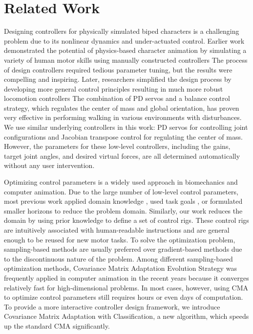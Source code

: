\section{Related Work}

Designing controllers for physically simulated biped characters is a
challenging problem due to its nonlinear dynamics and under-actuated
control. Earlier work demonstrated the potential of physics-based
character animation by simulating a variety of human motor skills
using manually constructed controllers
The process of design
controllers required tedious parameter tuning, but the results were
compelling and inspiring. Later, researchers simplified the design
process by developing more general control principles 
resulting in much more robust locomotion controllers
The combination of PD servos and a
balance control strategy, which regulates the center of mass and
global orientation, has proven very effective in performing walking in
various environments with disturbances. We use similar underlying
controllers in this work: PD servos for controlling joint
configurations and Jacobian transpose control \cite{Sunada:1994:ACJ}
for regulating the center of mass. However, the parameters for these
low-level controllers, including the gains, target joint angles, and
desired virtual forces, are all determined automatically without any
user intervention.

Optimizing control parameters is a widely used approach in
biomechanics and computer animation. Due to the large number of
low-level control parameters, most previous work applied domain
knowledge \cite{Wang:2009:OWC,Wang:2010:OWC,Wang:2012:OLC}, used task
goals \cite{Yin:2008:CMA,Wu:2010:TBL,Liu:2012:TRC}, or formulated
smaller horizons \cite{Sok:2007:SBB} to reduce the problem
domain. Similarly, our work reduces the domain by using prior
knowledge to define a set of control rigs. These control rigs are
intuitively associated with human-readable instructions and are
general enough to be reused for new motor tasks. To solve the optimization
problem, sampling-based methods are usually preferred over
gradient-based methods due to the discontinuous nature of the
problem. Among different sampling-based optimization methods,
Covariance Matrix Adaptation Evolution Strategy \cite{Hansen:2004:CMA}
was frequently applied in computer animation in the recent years
because it converges relatively fast for high-dimensional problems. In
most cases, however, using CMA to optimize control parameters still
requires hours or even days of computation. To provide a more
interactive controller design framework, we introduce Covariance
Matrix Adaptation with Classification, a new algorithm, which speeds up
the standard CMA significantly.

